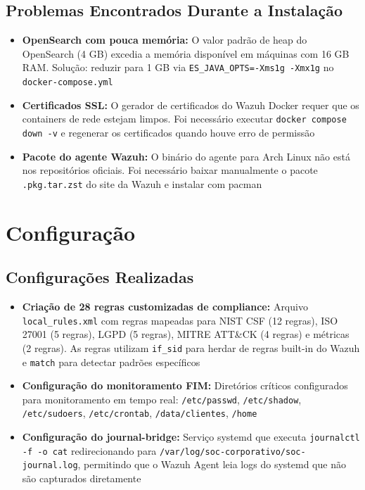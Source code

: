 \documentclass[12pt,a4paper]{article}
\begin{document}
    \subsection{Problemas Encontrados Durante a Instalação}

    \begin{itemize}
        \item \textbf{OpenSearch com pouca memória:} O valor padrão de heap do OpenSearch (4 GB) excedia a memória disponível em máquinas com 16 GB RAM. Solução: reduzir para 1 GB via \texttt{ES\_JAVA\_OPTS=-Xms1g -Xmx1g} no \texttt{docker-compose.yml}
        \item \textbf{Certificados SSL:} O gerador de certificados do Wazuh Docker requer que os containers de rede estejam limpos. Foi necessário executar \texttt{docker compose down -v} e regenerar os certificados quando houve erro de permissão
        \item \textbf{Pacote do agente Wazuh:} O binário do agente para Arch Linux não está nos repositórios oficiais. Foi necessário baixar manualmente o pacote \texttt{.pkg.tar.zst} do site da Wazuh e instalar com pacman
    \end{itemize}

    \newpage
    \section{Configuração}

    \subsection{Configurações Realizadas}

    \begin{itemize}
        \item \textbf{Criação de 28 regras customizadas de compliance:} Arquivo \texttt{local\_rules.xml} com regras mapeadas para NIST CSF (12 regras), ISO 27001 (5 regras), LGPD (5 regras), MITRE ATT\&CK (4 regras) e métricas (2 regras). As regras utilizam \texttt{if\_sid} para herdar de regras built-in do Wazuh e \texttt{match} para detectar padrões específicos
        \item \textbf{Configuração do monitoramento FIM:} Diretórios críticos configurados para monitoramento em tempo real: \texttt{/etc/passwd}, \texttt{/etc/shadow}, \texttt{/etc/sudoers}, \texttt{/etc/crontab}, \texttt{/data/clientes}, \texttt{/home}
        \item \textbf{Configuração do journal-bridge:} Serviço systemd que executa \texttt{journalctl -f -o cat} redirecionando para \texttt{/var/log/soc-corporativo/soc-journal.log}, permitindo que o Wazuh Agent leia logs do systemd que não são capturados diretamente
    \end{itemize}
\end{document}
